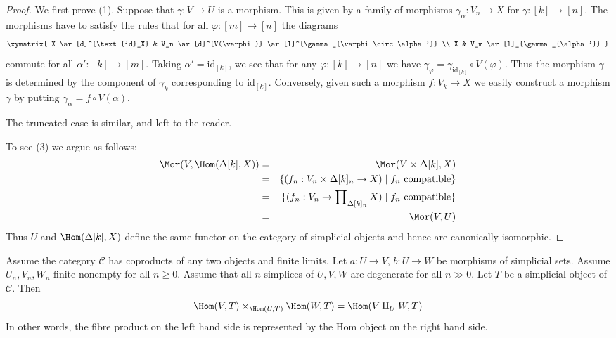 \begin{proof}
We first prove (1).
Suppose that $\gamma : V \to U$ is a morphism.
This is given by a family of morphisms
$\gamma_{\alpha} : V_n \to X$ for $\gamma : [k] \to [n]$.
The morphisms have to satisfy the
rules that for all $\varphi : [m] \to [n]$ the diagrams
$$
\xymatrix{
X \ar[d]^{\text{id}_X} &
V_n \ar[d]^{V(\varphi)}
\ar[l]^{\gamma_{\varphi \circ \alpha'}} \\
X &
V_m \ar[l]_{\gamma_{\alpha'}}
}
$$
commute for all $\alpha' : [k] \to [m]$.
Taking $\alpha' = \text{id}_{[k]}$, we see that
for any $\varphi : [k] \to [n]$ we have $\gamma_\varphi =
\gamma_{\text{id}_{[k]}} \circ V(\varphi)$. Thus the morphism
$\gamma$ is determined by the component of $\gamma_k$
corresponding to $\text{id}_{[k]}$. Conversely,
given such a morphism $f : V_k \to X$ we easily
construct a morphism $\gamma$ by putting
$\gamma_\alpha = f \circ V(\alpha)$.

\medskip\noindent
The truncated case is similar, and left to the reader.

\medskip\noindent
To see (3) we argue as follows:
\begin{eqnarray*}
\Mor(V, \Hom(\Delta[k], X)) & = &
\Mor(V \times \Delta[k], X) \\
& = & \{ (f_n : V_n \times \Delta[k]_n \to X) \mid
f_n \text{ compatible}\} \\
& = & \{ (f_n : V_n \to \prod\nolimits_{\Delta[k]_n} X) \mid
f_n \text{ compatible}\} \\
& = & \Mor(V, U)
\end{eqnarray*}
Thus $U$ and $\Hom(\Delta[k], X)$ define the same
functor on the category of simplicial objects and
hence are canonically isomorphic.
\end{proof}

\begin{lemma}
\label{lemma-hom-from-coprod}
Assume the category $\mathcal{C}$
has coproducts of any two objects and finite
limits. Let $a : U \to V$, $b : U \to W$
be morphisms of simplicial sets.
Assume $U_n, V_n, W_n$ finite nonempty for all $n \geq 0$.
Assume that all $n$-simplices of $U, V, W$
are degenerate for all $n \gg 0$.
Let $T$ be a simplicial object of $\mathcal{C}$.
Then
$$
\Hom(V, T) \times_{\Hom(U, T)} \Hom(W, T)
=
\Hom(V \amalg_U W, T)
$$
In other words, the fibre product on the left hand
side is represented by the Hom object on the right hand side.
\end{lemma}

